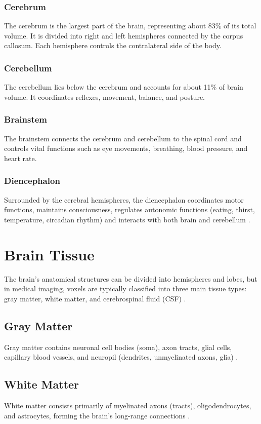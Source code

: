 \subsubsection*{Cerebrum}
The cerebrum is the largest part of the brain, representing about 83\% of its total volume. It is divided into right and left hemispheres connected by the corpus callosum. Each hemisphere controls the contralateral side of the body.

\subsubsection*{Cerebellum}
The cerebellum lies below the cerebrum and accounts for about 11\% of brain volume. It coordinates reflexes, movement, balance, and posture.

\subsubsection*{Brainstem}
The brainstem connects the cerebrum and cerebellum to the spinal cord and controls vital functions such as eye movements, breathing, blood pressure, and heart rate.

\subsubsection*{Diencephalon}
Surrounded by the cerebral hemispheres, the diencephalon coordinates motor functions, maintains consciousness, regulates autonomic functions (eating, thirst, temperature, circadian rhythm) and interacts with both brain and cerebellum \cite{ref4}.

\section{Brain Tissue}
The brain's anatomical structures can be divided into hemispheres and lobes, but in medical imaging, voxels are typically classified into three main tissue types: gray matter, white matter, and cerebrospinal fluid (CSF) \cite{ref1}.

\subsection*{Gray Matter}
Gray matter contains neuronal cell bodies (soma), axon tracts, glial cells, capillary blood vessels, and neuropil (dendrites, unmyelinated axons, glia) \cite{ref5}.

\subsection*{White Matter}
White matter consists primarily of myelinated axons (tracts), oligodendrocytes, and astrocytes, forming the brain’s long-range connections \cite{ref5}.

